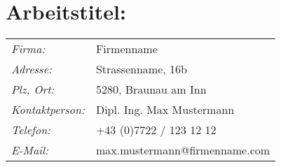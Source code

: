 

\chapter*{Arbeitstitel: \newline \htlArbeitstitel}






\renewcommand{\arraystretch}{1.5}
\begin{tabularx}{1\textwidth}{@{} l X @{}}

\emph{Firma:} & Firmenname\\
\emph{Adresse:} & Strassenname, 16b\\
\emph{Plz, Ort:} & 5280, Braunau am Inn\\
\emph{Kontaktperson:} & Dipl. Ing. Max Mustermann\\
\emph{Telefon:} & +43 (0)7722 / 123 12 12\\
\emph{E-Mail:} & max.mustermann@firmenname.com\\

\end{tabularx}
